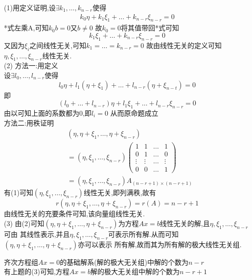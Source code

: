 \documentclass[12pt, a4paper, oneside, UTF8]{ctexbook}
\begin{document}
\begin{enumerate}
    \begin{solution}
    (1)用定义证明,设$\exists k_1,\ldots,k_{n-r}$使得 
    \begin{align*}
        k_0\eta+k_1\xi_1+\ldots+k_{n-r}\xi_{n-r}=0 \tag{*}
    \end{align*}
    *式左乘A,可知$k_0 b = 0$又$b\neq 0$ 故$k_0=0$将其值带回*式可知
    $$
    k_1\xi_1+\ldots+k_{n-r}\xi_{n-r} = 0
    $$
    又因为$\xi_i$之间线性无关,可知$k_1=\ldots=k_{n-r}=0$ 故由线性无关的定义可知$\eta,\xi_1,\ldots,\xi_{n-r}$线性无关.  \\
    (2) 方法一:用定义 \\
    设$\exists l_0,\ldots,l_{n-r}$使得 
    $$
    l_0\eta + l_1(\eta+\xi_1) + \ldots + l_{n-r}(\eta+\xi_{n-t}) = 0
    $$
    即
    $$
    (l_0+\ldots+l_{n-r})\eta + l_1\xi_1 + \ldots + l_{n-r}\xi_{n-r} = 0
    $$
    由以可知上面的系数都为0,即$l_i = 0$ 从而原命题成立 \\
    方法二:用秩证明
    \begin{align*}
        &(\eta, \eta+\xi_1,\ldots,\eta+\xi_{n-r}) \\
        &=(\eta,\xi_1,\ldots,\xi_{n-r})\begin{pmatrix}
            1 & 1 & \ldots & 1 \\
            0 & 1 & \ldots & 0 \\
            \vdots & \vdots & \ldots & \vdots \\
            0 & 0 & \ldots & 1 
        \end{pmatrix} \\
        & = (\eta,\xi_1,\ldots,\xi_{n-r}) A_{(n-r+1)\times(n-r+1)}
    \end{align*}
    有(1)可知$(\eta,\xi_1,\ldots,\xi_{n-r})$线性无关,即列满秩,故有
    $$
    r(\eta, \eta+\xi_1,\ldots,\eta+\xi_{n-r}) = r(A) = n - r + 1
    $$
    由线性无关的充要条件可知,该向量组线性无关.  \\
    (3) 由(2)可知$(\eta, \eta+\xi_1,\ldots,\eta+\xi_{n-r})$为方程$Ax=b$线性无关的解,且$\eta,\xi_1,\ldots,\xi_{n-r}$可由
    其线性表示,并且$\eta,\xi_1,\ldots,\xi_{n-r}$可表示所有解.从而可知$(\eta, \eta+\xi_1,\ldots,\eta+\xi_{n-r})$亦可以表示
    所有解,故而其为所有解的极大线性无关组. 
    \end{solution}
    \begin{definition}[(非)齐次方程解的个数]
        齐次方程组$Ax=0$的基础解系(解的极大无关组)中解的个数为$n-r$ \\
        有上题的(3)可知,方程$Ax=b$解的极大无关组中解的个数为$n-r+1$  
    \end{definition}


\end{enumerate}
\end{document}
